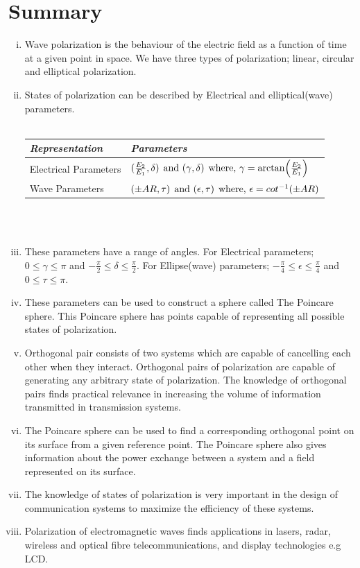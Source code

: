 \section{Summary}
\begin{enumerate}[(i)]
\item Wave polarization is the behaviour of the electric field as a function of time at a given point in space. We have three types of polarization; linear, circular and elliptical polarization.
\item States of polarization can be described by Electrical and elliptical(wave) parameters. \\
\\
\begin{tabular}{|l|m{4.5cm}|}
	\hline 
	\textit{Representation} &\textit{Parameters} \\ \hline %
	Electrical Parameters &  $ (\frac{E_{2}}{E_{1}}, \delta)\hspace{0.15cm}  \text{and } (\gamma, \delta)\hspace{0.15cm} \text{where, } \gamma = \arctan(\frac{E_{2}}{E_{1}}) $\\  \hline     %
	Wave Parameters & $ (\pm AR, \tau)\hspace{0.15cm}  \text{and } (\epsilon, \tau)\hspace{0.15cm} \text{where, } \epsilon = cot^{-1}(\pm AR) $ \\ \hline %
\end{tabular} \\
\\
\item These parameters have a range of angles. For Electrical parameters; $ 0 \leq \gamma \leq \pi $ and $ -\frac{\pi}{2} \leq \delta \leq \frac{\pi}{2}$. For Ellipse(wave) parameters; $ -\frac{\pi}{4} \leq \epsilon \leq \frac{\pi}{4}$ and $ 0 \leq \tau \leq \pi $.
\item These parameters can be used to construct a sphere called The Poincare sphere. This Poincare sphere has points capable of representing all possible states of polarization.
\item  Orthogonal pair consists of two systems which are capable of cancelling each other when they interact. Orthogonal pairs of polarization are capable of generating any arbitrary state of polarization. The knowledge of orthogonal pairs finds practical relevance in increasing the volume of information transmitted in transmission systems. 
\item The Poincare sphere can be used to find a corresponding orthogonal point on its surface from a given reference point. The Poincare sphere also gives information about the power exchange between a system and a field represented on its surface.
\item The knowledge of states of polarization is very important in the design of communication systems to maximize the efficiency of these systems. 
\item  Polarization of electromagnetic waves finds applications in lasers, radar, wireless and optical fibre telecommunications, and display technologies e.g LCD.
\end{enumerate}